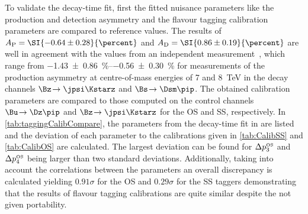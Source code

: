 To validate the decay-time fit, first the fitted nuisance parameters like the production and detection asymmetry and the flavour tagging calibration parameters are compared to reference values.
The results of $A_{\text{P}}=\SI{-0.64\pm0.28}{\percent}$ and $A_{\text{D}}=\SI{0.86\pm0.19}{\percent}$ are well in agreement with the values from an independent \lhcb measurement~\cite{Aaij:2017mso}, which \eg range from \SIrange{-1.43\pm0.86}{-0.56\pm0.30}{\percent} for measurements of the production asymmetry at centre-of-mass energies of \num{7} and \SI{8}{\tera\electronvolt} in the decay channels $\Bz\!\to\jpsi\Kstarz$ and $\Bs\!\to\Dsm\pip$.
The obtained calibration parameters are compared to those computed on the control channels $\Bu\!\to\Dz\pip$ and $\Bz\!\to\jpsi\Kstarz$ for the OS and SS, respectively.
In \cref{tab:taggingCalibCompare}, the parameters from the decay-time fit in \BdToDpi are listed and the deviation of each parameter to the calibrations given in \cref{tab:CalibSS} and \cref{tab:CalibOS} are calculated.
The largest deviation can be found for $\Delta p_{3}^{\text{\tiny OS}}$ and $\Delta p_{4}^{\text{\tiny OS}}$ being larger than two standard deviations.
Additionally, taking into account the correlations between the parameters an overall discrepancy is calculated yielding $0.91\sigma$ for the OS and $0.29\sigma$ for the SS taggers demonstrating that the results of flavour tagging calibrations are quite similar despite the not given portability.
